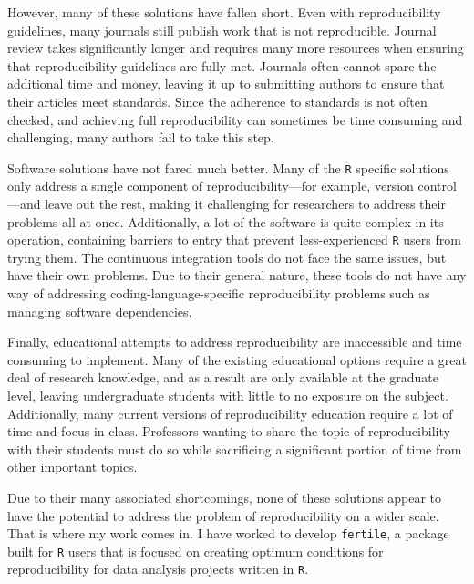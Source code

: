 \documentclass[12pt,twoside]{reedthesis}
\begin{document}
However, many of these solutions have fallen short. Even with reproducibility guidelines, many journals still publish work that is not reproducible. Journal review takes significantly longer and requires many more resources when ensuring that reproducibility guidelines are fully met. Journals often cannot spare the additional time and money, leaving it up to submitting authors to ensure that their articles meet standards. Since the adherence to standards is not often checked, and achieving full reproducibility can sometimes be time consuming and challenging, many authors fail to take this step.

Software solutions have not fared much better. Many of the \texttt{R} specific solutions only address a single component of reproducibility---for example, version control---and leave out the rest, making it challenging for researchers to address their problems all at once. Additionally, a lot of the software is quite complex in its operation, containing barriers to entry that prevent less-experienced \texttt{R} users from trying them. The continuous integration tools do not face the same issues, but have their own problems. Due to their general nature, these tools do not have any way of addressing coding-language-specific reproducibility problems such as managing software dependencies.

Finally, educational attempts to address reproducibility are inaccessible and time consuming to implement. Many of the existing educational options require a great deal of research knowledge, and as a result are only available at the graduate level, leaving undergraduate students with little to no exposure on the subject. Additionally, many current versions of reproducibility education require a lot of time and focus in class. Professors wanting to share the topic of reproducibility with their students must do so while sacrificing a significant portion of time from other important topics.

Due to their many associated shortcomings, none of these solutions appear to have the potential to address the problem of reproducibility on a wider scale. That is where my work comes in. I have worked to develop \texttt{fertile}, a package built for \texttt{R} users that is focused on creating optimum conditions for reproducibility for data analysis projects written in \texttt{R}.
\end{document}
